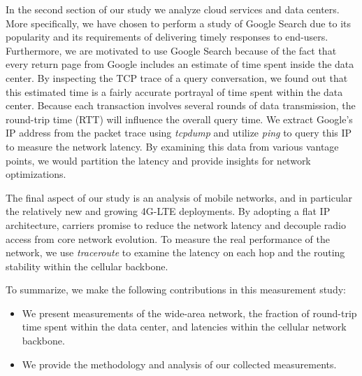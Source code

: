 In the second section of our study we analyze cloud services and data centers. More specifically, we have chosen to perform a study of Google Search due to its popularity and its requirements of delivering timely responses to end-users. Furthermore, we are motivated to use Google Search because of the fact that every return page from Google includes an estimate of time spent inside the data center. By inspecting the TCP trace of a query conversation, we found out that this estimated time is a fairly accurate portrayal of time spent within the data center. Because each transaction involves several rounds of data transmission, the round-trip time (RTT) will influence the overall query time. We extract Google's IP address from the packet trace using {\it tcpdump} and utilize {\it ping} to query this IP to measure the network latency. By examining this data from various vantage points, we would partition the latency and provide insights for network optimizations.

The final aspect of our study is an analysis of mobile networks, and in particular the relatively new and growing 4G-LTE deployments. By adopting a flat IP architecture, carriers promise to reduce the network latency and decouple radio access from core network evolution. To measure the real performance of the network, we use {\it traceroute} to examine the latency on each hop and the routing stability within the cellular backbone.

To summarize, we make the following contributions in this measurement study:
\begin{itemize}
\item We present measurements of the wide-area network, the fraction of round-trip time spent within the data center, and latencies within the cellular network backbone.
\item We provide the methodology and analysis of our collected measurements.
\end{itemize}



